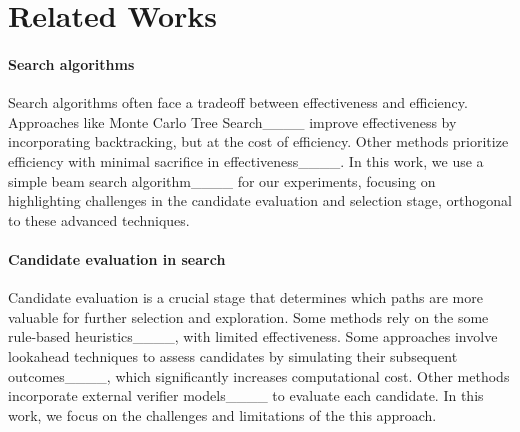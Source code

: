 \section{Related Works}
\paragraph{Search algorithms} 
Search algorithms often face a tradeoff between effectiveness and efficiency. Approaches like Monte Carlo Tree Search____ improve effectiveness by incorporating backtracking, but at the cost of efficiency. Other methods prioritize efficiency with minimal sacrifice in effectiveness____. In this work, we use a simple beam search algorithm____ for our experiments, focusing on highlighting challenges in the candidate evaluation and selection stage, orthogonal to these advanced techniques.



\paragraph{Candidate evaluation in search} 
Candidate evaluation is a crucial stage that determines which paths are more valuable for further selection and exploration. Some methods rely on the some rule-based heuristics____, with limited effectiveness. Some approaches involve lookahead techniques to assess candidates by simulating their subsequent outcomes____, which significantly increases computational cost. Other methods incorporate external verifier models____ to evaluate each candidate. In this work, we focus on the challenges and limitations of the this approach.

